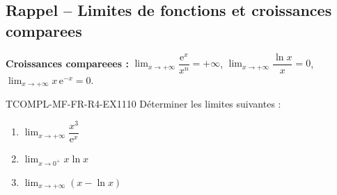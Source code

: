 

\subsection*{Rappel -- Limites de fonctions et croissances comparees}

\textbf{Croissances compareees :} $\lim_{x \to +\infty} \dfrac{\mathrm{e}^x}{x^n} = +\infty$, $\lim_{x \to +\infty} \dfrac{\ln x}{x} = 0$, $\lim_{x \to +\infty} x\,\mathrm{e}^{-x} = 0$.

\begin{exercice}{TCOMPL-MF-FR-R4-EX1}{1}{10}
Déterminer les limites suivantes :
\begin{enumerate}
  \item $\lim_{x \to +\infty} \dfrac{x^3}{\mathrm{e}^x}$
  \item $\lim_{x \to 0^+} x \ln x$
  \item $\lim_{x \to +\infty} \left(x - \ln x\right)$
\end{enumerate}
\end{exercice}

